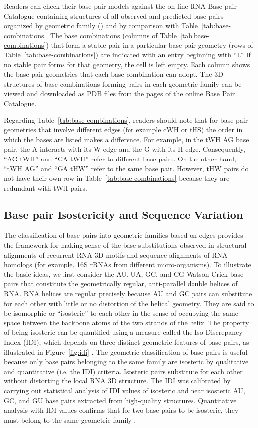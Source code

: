 Readers can check their base-pair models against the on-line RNA Base pair
Catalogue containing structures of all observed and predicted base pairs
organized by geometric family () and
by comparison with Table~\ref{tab:base-combinations}. The base combinations
(columns of Table~\ref{tab:base-combinations}) that form a stable pair in a
particular base pair geometry (rows of Table~\ref{tab:base-combinations}) are
indicated with an entry beginning with ``I.'' If no stable pair forms for that
geometry, the cell is left empty. Each column shows the base pair geometries
that each base combination can adopt. The 3D structures of base combinations
forming pairs in each geometric family can be viewed and downloaded as PDB files
from the pages of the online Base Pair Catalogue. 

Regarding Table~\ref{tab:base-combinations}, readers should note that for base pair geometries that
involve different edges (for example cWH or tHS) the order in which the bases
are listed makes a difference. For example, in the tWH AG base pair, the A
interacts with its W edge and the G with its H edge. Consequently, ``AG tWH''
and ``GA tWH'' refer to different base pairs. On the other hand, ``tWH AG'' and
``GA tHW'' refer to the same base pair. However, tHW pairs do not have their own
row in Table~\ref{tab:base-combinations} because they are redundant with tWH pairs. 

\subsection{Base pair Isostericity and Sequence Variation}

The classification of base pairs into geometric families based on edges provides
the framework for making sense of the base substitutions observed in structural
alignments of recurrent RNA 3D motifs and sequence alignments of RNA homologs
(for example, 16S rRNAs from different micro-organisms). To illustrate the basic
ideas, we first consider the AU, UA, GC, and CG Watson-Crick base pairs that
constitute the geometrically regular, anti-parallel double helices of RNA. RNA
helices are regular precisely because AU and GC pairs can substitute for each
other with little or no distortion of the helical geometry. They are said to be
isomorphic or “isosteric” to each other in the sense of occupying the same space
between the backbone atoms of the two strands of the helix. The property of
being isosteric can be quantified using a measure called the Iso-Discrepancy
Index (IDI), which depends on three distinct geometric features of base-pairs,
as illustrated in Figure~\ref{fig:idi} \cite{Stombaugh2009}. The geometric
classification of base pairs is useful because only base pairs belonging to the
same family are isosteric by qualitative and quantitative (i.e. the IDI)
criteria. Isosteric pairs substitute for each other without distorting the local
RNA 3D structure. The IDI was calibrated by carrying out statistical analysis of
IDI values of isosteric and near isosteric AU, GC, and GU base pairs extracted
from high-quality structures. Quantitative analysis with IDI values confirms
that for two base pairs to be isosteric, they must belong to the same geometric
family \cite{Stombaugh2009}. 

